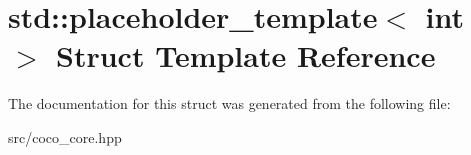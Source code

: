 \hypertarget{structstd_1_1placeholder__template}{}\section{std\+:\+:placeholder\+\_\+template$<$ int $>$ Struct Template Reference}
\label{structstd_1_1placeholder__template}


The documentation for this struct was generated from the following file\+:\begin{DoxyCompactItemize}
\item 
src/coco\+\_\+core.\+hpp\end{DoxyCompactItemize}
